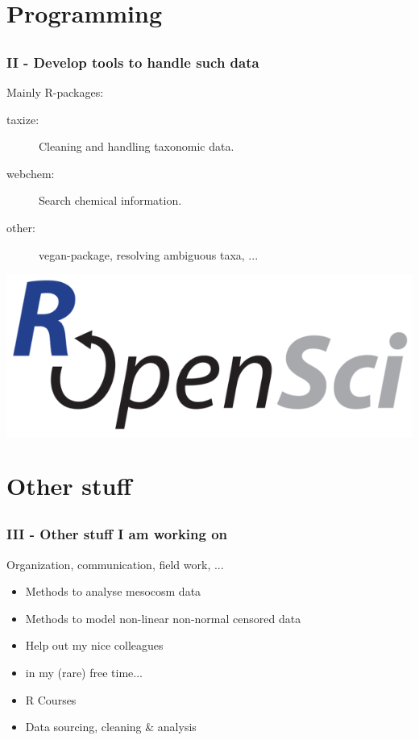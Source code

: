 \documentclass[12pt, t]{beamer}
\begin{document}
\section{Programming}
\subsection{}
\begin{frame}
\frametitle{II - Develop tools to handle such data}
\vspace{1em}
Mainly R-packages:

\begin{description}
	\item[taxize: ] Cleaning and handling \textcolor{hilight}{taxonomic} data.
	\item[webchem: ] Search \textcolor{hilight}{chemical} information.
	\item[other: ] vegan-package, resolving ambiguous taxa, ...
\end{description}
\vfill
\colorbox{white}{\includegraphics[width =.3\textwidth]{fig/ropensci.png}}
\end{frame}



\section{Other stuff}
\subsection{}
\begin{frame}
\frametitle{III - Other stuff I am working on}
\vspace{1em}
\begin{description}
\setlength\itemsep{1em}
\item[Field study:  ]{Organization, communication, field work, ...	}
\item[Statistics: ] {
	\begin{itemize}
		\item Methods to analyse mesocosm data
		\item Methods to model non-linear non-normal censored data
		\item Help out my nice colleagues
	\end{itemize}
}
\item[Freelance: ] {
	\begin{itemize}
		\item in my (rare) free time...
		\item R Courses
		\item Data sourcing, cleaning \& analysis
	\end{itemize}
}
\end{description}
\end{frame}
\end{document}
